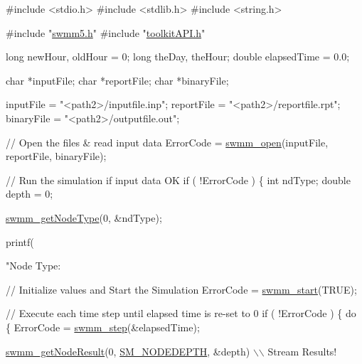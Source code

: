 \begin{DoxyCode}
\textcolor{preprocessor}{#include <stdio.h>}
\textcolor{preprocessor}{#include <stdlib.h>}
\textcolor{preprocessor}{#include <string.h>}

\textcolor{preprocessor}{#include "\hyperlink{swmm5_8h}{swmm5.h}"}
\textcolor{preprocessor}{#include "\hyperlink{toolkit_a_p_i_8h}{toolkitAPI.h}"}

\textcolor{keywordtype}{long} newHour, oldHour = 0;
\textcolor{keywordtype}{long} theDay, theHour;
\textcolor{keywordtype}{double} elapsedTime = 0.0;

\textcolor{keywordtype}{char} *inputFile;
\textcolor{keywordtype}{char} *reportFile;
\textcolor{keywordtype}{char} *binaryFile;

inputFile = \textcolor{stringliteral}{"<path2>/inputfile.inp"};
reportFile = \textcolor{stringliteral}{"<path2>/reportfile.rpt"};
binaryFile = \textcolor{stringliteral}{"<path2>/outputfile.out"};

\textcolor{comment}{// Open the files & read input data}
ErrorCode = \hyperlink{swmm5_8h_a2da4baa38e451ef2a978f1366898948e}{swmm\_open}(inputFile, reportFile, binaryFile);

\textcolor{comment}{// Run the simulation if input data OK}
\textcolor{keywordflow}{if} ( !ErrorCode )
\{
    \textcolor{keywordtype}{int} ndType;
    \textcolor{keywordtype}{double} depth = 0;

    \hyperlink{group___network_info_gae66a64aee207928c902cb399222cf418}{swmm\_getNodeType}(0, &ndType);

    printf(\textcolor{stringliteral}{"Node Type: %

    \textcolor{comment}{// Initialize values and Start the Simulation}
    ErrorCode = \hyperlink{swmm5_8h_a06eb7b28597a24f892edfc303e12b2d7}{swmm\_start}(TRUE);

    \textcolor{comment}{// Execute each time step until elapsed time is re-set to 0}
    \textcolor{keywordflow}{if} ( !ErrorCode )
    \{
        \textcolor{keywordflow}{do}
        \{
            ErrorCode = \hyperlink{swmm5_8h_a20624449e77d94d71c0e61d7f58558b5}{swmm\_step}(&elapsedTime);

            \hyperlink{group__tkfuncs_gacef44d121a8f9a646f4e6f108b494373}{swmm\_getNodeResult}(0, \hyperlink{toolkit_a_p_i_8h_aa5c50a52f0aa8cb1bcbb5130e8fa64e2a36c502c185c63b612ddc65ad469d027f}{SM\_NODEDEPTH}, &depth) \(\backslash\)\(\backslash\) Stream Results!

}
\end{DoxyCode}
